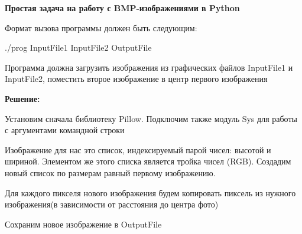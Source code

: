 \documentclass{article}
\begin{document}
\begin{center}
\Large\bf Простая задача на работу с BMP-изображениями в Python
\end{center}

Формат вызова программы должен быть следующим:

./prog InputFile1 InputFile2 OutputFile

Программа должна загрузить изображения из графических файлов
InputFile1 и InputFile2, поместить второе изображение в центр первого
изображения

{\large\bf Решение:}

Установим сначала библиотеку Pillow. Подключим также модуль Sys для работы с аргументами командной строки

Изображение для нас это список, индексируемый парой чисел: высотой и шириной. Элементом же этого списка является тройка чисел (RGB). Создадим новый список по размерам равный первому изображению.

Для каждого пикселя нового изображения будем копировать пиксель из нужного изображения(в зависимости от расстояния до центра фото)

Сохраним новое изображение в OutputFile
\end{document}
